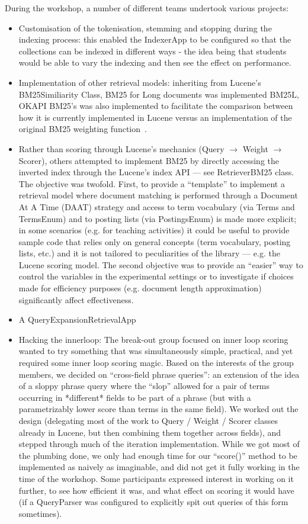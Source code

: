 During the workshop, a number of different teams undertook various projects:
\begin{itemize}
	\item Customisation of the tokenisation, stemming and stopping during the indexing process: this enabled the IndexerApp to be configured so that the collections can be indexed in different ways - the idea being that students would be able to vary the indexing and then see the effect on performance.
	\item Implementation of other retrieval models: inheriting from Lucene's BM25Similiarity Class, BM25 for Long documents was implemented BM25L\cite{Lv:2011:DVL:2009916.2010070}, OKAPI BM25's was also implemented to facilitate the comparison between how it is currently implemented in Lucene versus an implementation of the original BM25 weighting function~\cite{}.
	\item Rather than scoring through Lucene's mechanics (Query $\rightarrow$ Weight $\rightarrow$ Scorer), others attempted to implement BM25 by directly accessing the inverted index through the Lucene's index API --- see RetrieverBM25 class. The objective was twofold. First, to provide a ``template'' to implement a retrieval model where document matching is performed through a Document At A Time (DAAT) strategy and access to term vocabulary (via Terms and TermsEnum) and to posting lists (via PostingsEnum) is made more explicit; in some scenarios (e.g. for teaching activities) it could be useful to provide sample code that relies only on general concepts (term vocabulary, posting lists, etc.) and it is not tailored to peculiarities of the library --- e.g. the Lucene scoring model. The second objective was to provide an ``easier'' way to control the variables in the experimental settings or to investigate if choices made for efficiency purposes (e.g. document length approximation) significantly affect effectiveness.
	\item A QueryExpansionRetrievalApp
	\item Hacking the innerloop:  The break-out group focused on inner loop scoring wanted to try something that was simultaneously simple, practical, and yet required some inner loop scoring magic.  Based on the interests of the group members, we decided on ``cross-field phrase queries'': an extension of the idea of a sloppy phrase query where the ``slop'' allowed for a pair of terms occurring in *different* fields to be part of a phrase (but with a parametrizably lower score than terms in the same field).  We worked out the design (delegating most of the work to Query / Weight / Scorer classes already in Lucene, but then combining them together across fields), and stepped through much of the iteration implementation.  While we got most of the plumbing done, we only had enough time for our ``score()'' method to be implemented as naively as imaginable, and did not get it fully working in the time of the workshop.  Some participants expressed interest in working on it further, to see how efficient it was, and what effect on scoring it would have (if a QueryParser was configured to explicitly spit out queries of this form sometimes).

\end{itemize}
